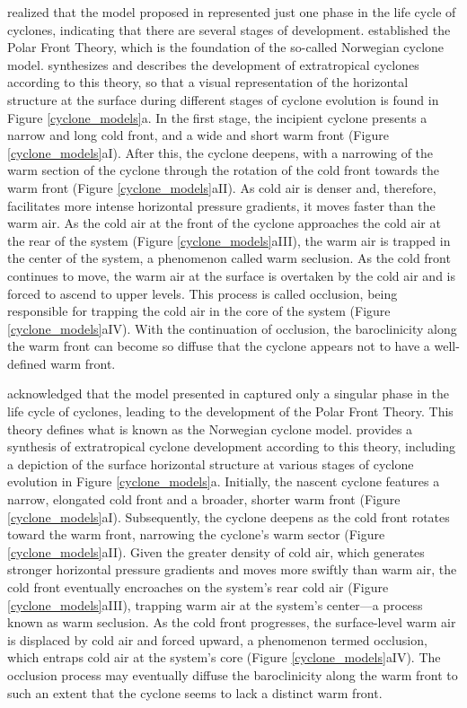 \citet{bjerknes1922life} realized that the model proposed in \citet{bjerknes1919structure} represented just one phase in the life cycle of cyclones, indicating that there are several stages of development. \citet{bjerknes1922life} established the Polar Front Theory, which is the foundation of the so-called Norwegian cyclone model. \citet{schultz1998effect} synthesizes and describes the development of extratropical cyclones according to this theory, so that a visual representation of the horizontal structure at the surface during different stages of cyclone evolution is found in Figure \ref{cyclone_models}a. In the first stage, the incipient cyclone presents a narrow and long cold front, and a wide and short warm front (Figure \ref{cyclone_models}aI). After this, the cyclone deepens, with a narrowing of the warm section of the cyclone through the rotation of the cold front towards the warm front (Figure \ref{cyclone_models}aII). As cold air is denser and, therefore, facilitates more intense horizontal pressure gradients, it moves faster than the warm air. As the cold air at the front of the cyclone approaches the cold air at the rear of the system (Figure \ref{cyclone_models}aIII), the warm air is trapped in the center of the system, a phenomenon called warm seclusion. As the cold front continues to move, the warm air at the surface is overtaken by the cold air and is forced to ascend to upper levels. This process is called occlusion, being responsible for trapping the cold air in the core of the system (Figure \ref{cyclone_models}aIV). With the continuation of occlusion, the baroclinicity along the warm front can become so diffuse that the cyclone appears not to have a well-defined warm front.

\citet{bjerknes1922life} acknowledged that the model presented in \citet{bjerknes1919structure} captured only a singular phase in the life cycle of cyclones, leading to the development of the Polar Front Theory. This theory defines what is known as the Norwegian cyclone model. \citet{schultz1998effect} provides a synthesis of extratropical cyclone development according to this theory, including a depiction of the surface horizontal structure at various stages of cyclone evolution in Figure \ref{cyclone_models}a. Initially, the nascent cyclone features a narrow, elongated cold front and a broader, shorter warm front (Figure \ref{cyclone_models}aI). Subsequently, the cyclone deepens as the cold front rotates toward the warm front, narrowing the cyclone's warm sector (Figure \ref{cyclone_models}aII). Given the greater density of cold air, which generates stronger horizontal pressure gradients and moves more swiftly than warm air, the cold front eventually encroaches on the system's rear cold air (Figure \ref{cyclone_models}aIII), trapping warm air at the system's center—a process known as warm seclusion. As the cold front progresses, the surface-level warm air is displaced by cold air and forced upward, a phenomenon termed occlusion, which entraps cold air at the system's core (Figure \ref{cyclone_models}aIV). The occlusion process may eventually diffuse the baroclinicity along the warm front to such an extent that the cyclone seems to lack a distinct warm front.

